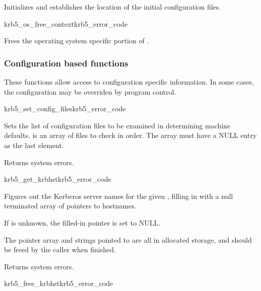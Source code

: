 \internalfunc

Initializes  and establishes the
location of the initial configuration files. 

\begin{funcdecl}{krb5_os_free_context}{krb5_error_code}{\funcinout}
\end{funcdecl}

\internalfunc

Frees the operating system specific portion of . 

\subsubsection{Configuration based functions}
These functions allow access to configuration specific information. In
some cases, the configuration may be overriden by program control.


\begin{funcdecl}{krb5_set_config_files}{krb5_error_code}{\funcinout}
\funcin
{}
\end{funcdecl}

Sets the list of configuration files to be examined in determining
machine defaults.  is an array of files to check in
order. The array must have a NULL entry as the last element.

Returns system errors.

\begin{funcdecl}{krb5_get_krbhst}{krb5_error_code}{\funcin}
\funcout
{}
\end{funcdecl}

Figures out the Kerberos server names for the given ,
filling in  with a null terminated array of
pointers to hostnames. 
 
If  is unknown, the filled-in pointer is set to NULL.

The pointer array and strings pointed to are all in allocated storage,
and should be freed by the caller when finished.

Returns system errors.

\begin{funcdecl}{krb5_free_krbhst}{krb5_error_code}{\funcin}
\end{funcdecl}

